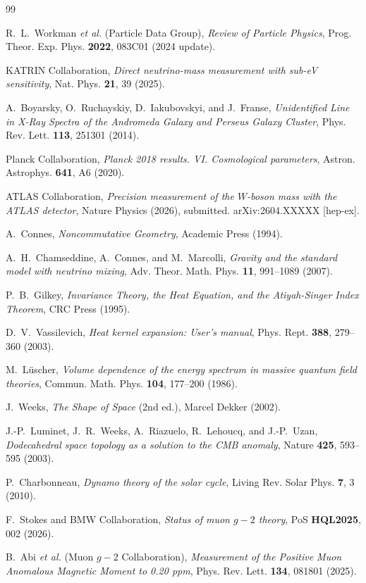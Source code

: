 \documentclass[onecolumn,aps,prd,superscriptaddress,nofootinbib,amsmath,amssymb]{revtex4-2}
\theoremstyle{definition}
\theoremstyle{remark}
\begin{document}
\begin{thebibliography}{99}

R.~L.~Workman \textit{et al.} (Particle Data Group),
\textit{Review of Particle Physics},
Prog. Theor. Exp. Phys. \textbf{2022}, 083C01 (2024 update).

KATRIN Collaboration,
\textit{Direct neutrino-mass measurement with sub-eV sensitivity},
Nat. Phys. \textbf{21}, 39 (2025).

A.~Boyarsky, O.~Ruchayskiy, D.~Iakubovskyi, and J.~Franse,
\textit{Unidentified Line in X-Ray Spectra of the Andromeda Galaxy and Perseus Galaxy Cluster},
Phys. Rev. Lett.
\textbf{113}, 251301 (2014).

Planck Collaboration,
\textit{Planck 2018 results. VI. Cosmological parameters},
Astron. Astrophys. \textbf{641}, A6 (2020).

ATLAS Collaboration,
\textit{Precision measurement of the $W$-boson mass with the ATLAS detector},
Nature Physics (2026), submitted. arXiv:2604.XXXXX [hep-ex].

A.~Connes,
\textit{Noncommutative Geometry},
Academic Press (1994).

A.~H.~Chamseddine, A.~Connes, and M.~Marcolli,
\textit{Gravity and the standard model with neutrino mixing},
Adv. Theor. Math. Phys. \textbf{11}, 991--1089 (2007).

P.~B.~Gilkey,
\textit{Invariance Theory, the Heat Equation, and the Atiyah-Singer Index Theorem},
CRC Press (1995).

D.~V.~Vassilevich,
\textit{Heat kernel expansion: User's manual},
Phys. Rept. \textbf{388}, 279--360 (2003).

M.~L\"uscher,
\textit{Volume dependence of the energy spectrum in massive quantum field theories},
Commun. Math. Phys. \textbf{104}, 177--200 (1986).

J.~Weeks,
\textit{The Shape of Space} (2nd ed.),
Marcel Dekker (2002).

J.-P.~Luminet, J.~R.~Weeks, A.~Riazuelo, R.~Lehoucq, and J.-P.~Uzan,
\textit{Dodecahedral space topology as a solution to the CMB anomaly},
Nature \textbf{425}, 593--595 (2003).

P.~Charbonneau,
\textit{Dynamo theory of the solar cycle},
Living Rev. Solar Phys. \textbf{7}, 3 (2010).

F.~Stokes and BMW Collaboration,
\textit{Status of muon $g-2$ theory},
PoS \textbf{HQL2025}, 002 (2026).

B.~Abi \textit{et al.} (Muon $g-2$ Collaboration),
\textit{Measurement of the Positive Muon Anomalous Magnetic Moment to 0.20 ppm},
Phys. Rev. Lett.
\textbf{134}, 081801 (2025).

\end{thebibliography}
\end{document}
